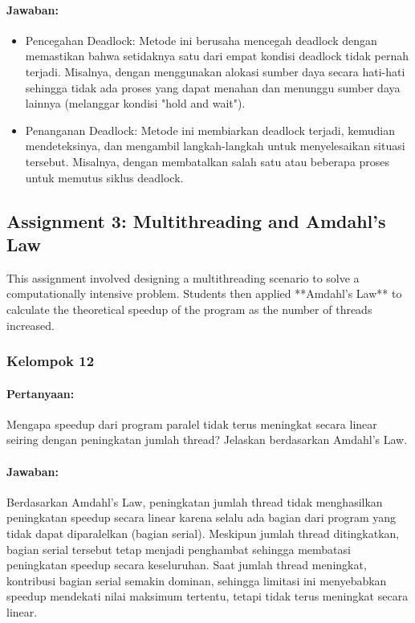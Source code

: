 \documentclass[12pt]{article}
\begin{document}
\paragraph{Jawaban:} 
\begin{itemize}
    \item Pencegahan Deadlock: Metode ini berusaha mencegah deadlock dengan memastikan bahwa setidaknya satu dari empat kondisi deadlock tidak pernah terjadi. Misalnya, dengan menggunakan alokasi sumber daya secara hati-hati sehingga tidak ada proses yang dapat menahan dan menunggu sumber daya lainnya (melanggar kondisi "hold and wait").

    \item Penanganan Deadlock: Metode ini membiarkan deadlock terjadi, kemudian mendeteksinya, dan mengambil langkah-langkah untuk menyelesaikan situasi tersebut. Misalnya, dengan membatalkan salah satu atau beberapa proses untuk memutus siklus deadlock.
\end{itemize}



\subsection{Assignment 3: Multithreading and Amdahl's Law}
This assignment involved designing a multithreading scenario to solve a computationally intensive problem. Students then applied **Amdahl's Law** to calculate the theoretical speedup of the program as the number of threads increased.
\subsubsection{Kelompok 12}
\paragraph{Pertanyaan:} Mengapa speedup dari program paralel tidak terus meningkat secara linear seiring dengan peningkatan jumlah thread? Jelaskan berdasarkan Amdahl's Law.

\paragraph{Jawaban:} Berdasarkan Amdahl's Law, peningkatan jumlah thread tidak menghasilkan peningkatan speedup secara linear karena selalu ada bagian dari program yang tidak dapat diparalelkan (bagian serial). Meskipun jumlah thread ditingkatkan, bagian serial tersebut tetap menjadi penghambat sehingga membatasi peningkatan speedup secara keseluruhan. Saat jumlah thread meningkat, kontribusi bagian serial semakin dominan, sehingga limitasi ini menyebabkan speedup mendekati nilai maksimum tertentu, tetapi tidak terus meningkat secara linear.
\end{document}
